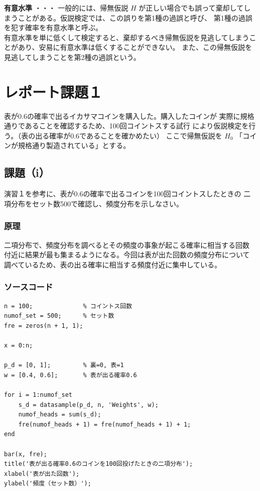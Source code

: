 \documentclass[10pt,a4paper,titlepage]{jreport} %
\begin{document}
\textbf{有意水準} ・・・ 一般的には、帰無仮説 $H$ が正しい場合でも誤って棄却してしまうことがある。仮説検定では、この誤りを第1種の過誤と呼び、
第1種の過誤を犯す確率を有意水準と呼ぶ。\\

有意水準を単に低くして検定すると、棄却するべき帰無仮説を見逃してしまうことがあり、安易に有意水準は低くすることができない。
また、この帰無仮説を見逃してしまうことを第2種の過誤という。

\section{レポート課題１}

表が0.6の確率で出るイカサマコインを購入した。購入したコインが
実際に規格通りであることを確認するため、100回コイントスする試行
により仮説検定を行う。（表の出る確率が0.6であることを確かめたい）
ここで帰無仮説を $H_0$ 「コインが規格通り製造されている」とする。

\subsection{課題（i）}

演習１を参考に、表が0.6の確率で出るコインを100回コイントスしたときの
二項分布をセット数500で確認し、頻度分布を示しなさい。

\subsubsection{原理}

二項分布で、頻度分布を調べるとその頻度の事象が起こる確率に相当する回数
付近に結果が最も集まるようになる。今回は表が出た回数の頻度分布について
調べているため、表の出る確率に相当する頻度付近に集中している。

\subsubsection{ソースコード}

\begin{lstlisting}[caption=kadai1]
n = 100;              % コイントス回数
numof_set = 500;      % セット数
fre = zeros(n + 1, 1);

x = 0:n;

p_d = [0, 1];         % 裏=0, 表=1
w = [0.4, 0.6];       % 表が出る確率0.6

for i = 1:numof_set
    s_d = datasample(p_d, n, 'Weights', w);
    numof_heads = sum(s_d);
    fre(numof_heads + 1) = fre(numof_heads + 1) + 1;
end

bar(x, fre);
title('表が出る確率0.6のコインを100回投げたときの二項分布');
xlabel('表が出た回数');
ylabel('頻度（セット数）');
\end{lstlisting}
\end{document}
